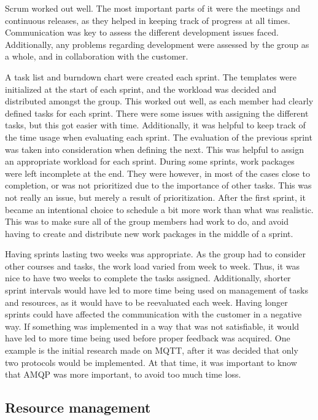 Scrum worked out well. The most important parts of it were the meetings and continuous releases, as they helped in keeping track of progress at all times. Communication was key to assess the different development issues faced. Additionally, any problems regarding development were assessed by the group as a whole, and in collaboration with the customer.

A task list and burndown chart were created each sprint. The templates were initialized at the start of each sprint, and the workload was decided and distributed amongst the group. This worked out well, as each member had clearly defined tasks for each sprint. There were some issues with assigning the different tasks, but this got easier with time. Additionally, it was helpful to keep track of the time usage when evaluating each sprint. The evaluation of the previous sprint was taken into consideration when defining the next. This was helpful to assign an appropriate workload for each sprint. During some sprints, work packages were left incomplete at the end. They were however, in most of the cases close to completion, or was not prioritized due to the importance of other tasks. This was not really an issue, but merely a result of prioritization. After the first sprint, it became an intentional choice to schedule a bit more work than what was realistic. This was to make sure all of the group members had work to do, and avoid having to create and distribute new work packages in the middle of a sprint.

Having sprints lasting two weeks was appropriate. As the group had to consider other courses and tasks, the work load varied from week to week. Thus, it was nice to have two weeks to complete the tasks assigned. Additionally, shorter sprint intervals would have led to more time being used on management of tasks and resources, as it would have to be reevaluated each week. Having longer sprints could have affected the communication with the customer in a negative way. If something was implemented in a way that was not satisfiable, it would have led to more time being used before proper feedback was acquired. One example is the initial research made on MQTT, after it was decided that only two protocols would be implemented. At that time, it was important to know that AMQP was more important, to avoid too much time loss.

\subsection{Resource management}
\label{subsec:project_evaluation-development-time_management}

